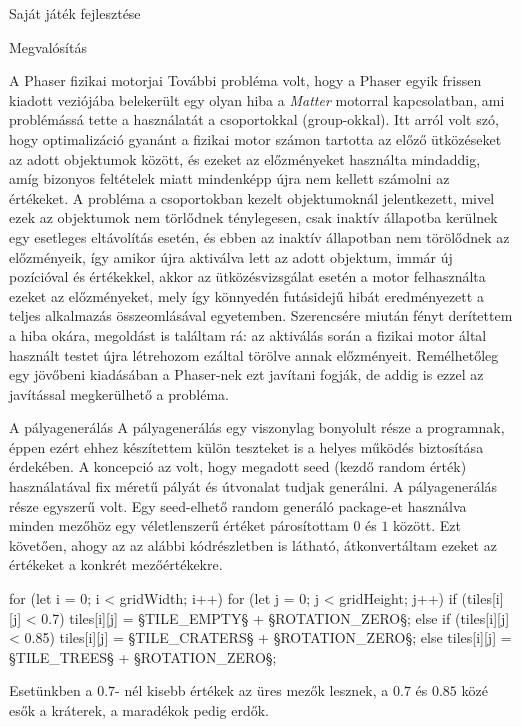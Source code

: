 \begin{MyChapter}{Saját játék fejlesztése}
\begin{MySection}{Megvalósítás}
\begin{MySubSection}{A Phaser fizikai motorjai}
			További probléma volt, hogy a Phaser egyik frissen kiadott veziójába belekerült egy olyan hiba a \textit{Matter} motorral kapcsolatban, ami problémássá tette a használatát a csoportokkal (group-okkal). Itt arról volt szó, hogy optimalizáció gyanánt a fizikai motor számon tartotta az előző ütközéseket az adott objektumok között, és ezeket az előzményeket használta mindaddig, amíg bizonyos feltételek miatt mindenképp újra nem kellett számolni az értékeket. A probléma a csoportokban kezelt objektumoknál jelentkezett, mivel ezek az objektumok nem törlődnek ténylegesen, csak inaktív állapotba kerülnek egy esetleges eltávolítás esetén, és ebben az inaktív állapotban nem törölődnek az előzményeik, így amikor újra aktiválva lett az adott objektum, immár új pozícióval és értékekkel, akkor az ütközésvizsgálat esetén a motor felhasználta ezeket az előzményeket, mely így könnyedén futásidejű hibát eredményezett a teljes alkalmazás összeomlásával egyetemben. Szerencsére miután fényt derítettem a hiba okára, megoldást is találtam rá: az aktiválás során a fizikai motor által használt testet újra létrehozom ezáltal törölve annak előzményeit. Remélhetőleg egy jövőbeni kiadásában a Phaser-nek ezt javítani fogják, de addig is ezzel az javítással megkerülhető a probléma.
		\end{MySubSection}
		
		\begin{MySubSection}{A pályagenerálás}
			A pályagenerálás egy viszonylag bonyolult része a programnak, éppen ezért ehhez készítettem külön teszteket is a helyes működés biztosítása érdekében.
			A koncepció az volt, hogy megadott seed (kezdő random érték) használatával fix méretű pályát és útvonalat tudjak generálni. A pályagenerálás része egyszerű volt. Egy seed-elhető random generáló package-et használva minden mezőhöz egy véletlenszerű értéket párosítottam $0$ és $1$ között. Ezt követően, ahogy az az alábbi kódrészletben is látható, átkonvertáltam ezeket az értékeket a konkrét mezőértékekre.
			\begin{javascript}
for (let i = 0; i < gridWidth; i++) {
	for (let j = 0; j < gridHeight; j++) {
		if (tiles[i][j] < 0.7) {
			tiles[i][j] = §\color{jsConst}TILE\_EMPTY§ + §\color{jsConst}ROTATION\_ZERO§;
		} else if (tiles[i][j] < 0.85) {
			tiles[i][j] = §\color{jsConst}TILE\_CRATERS§ + §\color{jsConst}ROTATION\_ZERO§;
		} else {
			tiles[i][j] = §\color{jsConst}TILE\_TREES§ + §\color{jsConst}ROTATION\_ZERO§;
		}
	}
}
			\end{javascript}
			Esetünkben a $0.7$- nél kisebb értékek az üres mezők lesznek, a $0.7$ és $0.85$ közé esők a kráterek, a maradékok pedig erdők.
			

\end{MySubSection}
\end{MySection}
\end{MyChapter}
